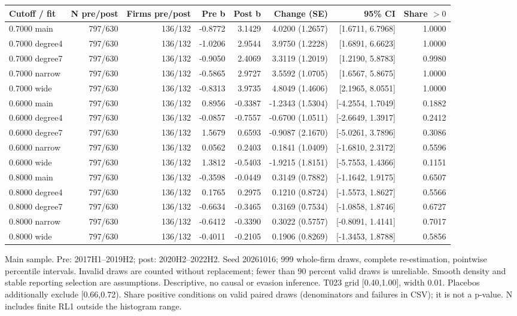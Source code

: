 \begingroup\scriptsize\setlength{\tabcolsep}{3pt}
\begin{threeparttable}
\begin{tabular}{lrrrrrrr}
\toprule
Cutoff / fit & N pre/post & Firms pre/post & Pre b & Post b & Change (SE) & 95\% CI & Share $>0$ \\
\midrule
0.7000 main & 797/630 & 136/132 & -0.8772 & 3.1429 & 4.0200 (1.2657) & [1.6711, 6.7968] & 1.0000 \\
0.7000 degree4 & 797/630 & 136/132 & -1.0206 & 2.9544 & 3.9750 (1.2228) & [1.6891, 6.6623] & 1.0000 \\
0.7000 degree7 & 797/630 & 136/132 & -0.9050 & 2.4069 & 3.3119 (1.2019) & [1.2190, 5.8783] & 0.9980 \\
0.7000 narrow & 797/630 & 136/132 & -0.5865 & 2.9727 & 3.5592 (1.0705) & [1.6567, 5.8675] & 1.0000 \\
0.7000 wide & 797/630 & 136/132 & -0.8313 & 3.9735 & 4.8049 (1.4606) & [2.1965, 8.0551] & 1.0000 \\
0.6000 main & 797/630 & 136/132 & 0.8956 & -0.3387 & -1.2343 (1.5304) & [-4.2554, 1.7049] & 0.1882 \\
0.6000 degree4 & 797/630 & 136/132 & -0.0857 & -0.7557 & -0.6700 (1.0511) & [-2.6649, 1.3917] & 0.2412 \\
0.6000 degree7 & 797/630 & 136/132 & 1.5679 & 0.6593 & -0.9087 (2.1670) & [-5.0261, 3.7896] & 0.3086 \\
0.6000 narrow & 797/630 & 136/132 & 0.0562 & 0.2403 & 0.1841 (1.0409) & [-1.6810, 2.3172] & 0.5596 \\
0.6000 wide & 797/630 & 136/132 & 1.3812 & -0.5403 & -1.9215 (1.8151) & [-5.7553, 1.4366] & 0.1151 \\
0.8000 main & 797/630 & 136/132 & -0.3598 & -0.0449 & 0.3149 (0.7882) & [-1.1642, 1.9175] & 0.6507 \\
0.8000 degree4 & 797/630 & 136/132 & 0.1765 & 0.2975 & 0.1210 (0.8724) & [-1.5573, 1.8627] & 0.5566 \\
0.8000 degree7 & 797/630 & 136/132 & -0.6634 & -0.3465 & 0.3169 (0.7534) & [-1.0858, 1.8746] & 0.6727 \\
0.8000 narrow & 797/630 & 136/132 & -0.6412 & -0.3390 & 0.3022 (0.5757) & [-0.8091, 1.4141] & 0.7017 \\
0.8000 wide & 797/630 & 136/132 & -0.4011 & -0.2105 & 0.1906 (0.8269) & [-1.3453, 1.8788] & 0.5856 \\
\bottomrule
\end{tabular}
\begin{tablenotes}[flushleft]\footnotesize
\item[] Main sample. Pre: 2017H1--2019H2; post: 2020H2--2022H2. Seed 20261016; 999 whole-firm draws, complete re-estimation, pointwise percentile intervals. Invalid draws are counted without replacement; fewer than 90 percent valid draws is unreliable. Smooth density and stable reporting selection are assumptions. Descriptive, no causal or evasion inference. T023 grid [0.40,1.00], width 0.01. Placebos additionally exclude [0.66,0.72). Share positive conditions on valid paired draws (denominators and failures in CSV); it is not a p-value. N includes finite RL1 outside the histogram range.
\end{tablenotes}
\end{threeparttable}
\endgroup
\par\medskip
